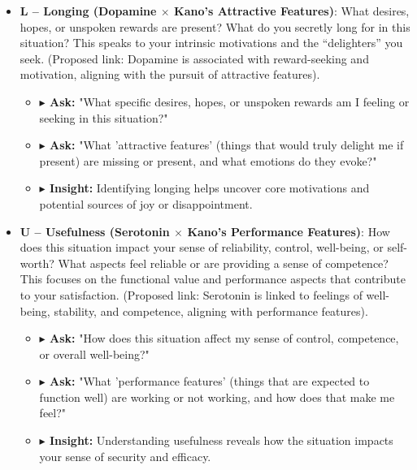 \documentclass{article}
\begin{document}
\begin{center}
\end{center}

\begin{itemize}[noitemsep,topsep=0pt]
    \item \textbf{L – Longing (Dopamine $\times$ Kano’s Attractive Features)}: What desires, hopes, or unspoken rewards are present? What do you secretly long for in this situation? This speaks to your intrinsic motivations and the ``delighters'' you seek. (Proposed link: Dopamine is associated with reward-seeking and motivation, aligning with the pursuit of attractive features).
    \begin{itemize}[noitemsep,topsep=0pt]
        \item \textbf{$\blacktriangleright$ Ask:} "What specific desires, hopes, or unspoken rewards am I feeling or seeking in this situation?"
        \item \textbf{$\blacktriangleright$ Ask:} "What 'attractive features' (things that would truly delight me if present) are missing or present, and what emotions do they evoke?"
        \item \textbf{$\blacktriangleright$ Insight:} Identifying longing helps uncover core motivations and potential sources of joy or disappointment.
    \end{itemize}
    \item \textbf{U – Usefulness (Serotonin $\times$ Kano’s Performance Features)}: How does this situation impact your sense of reliability, control, well-being, or self-worth? What aspects feel reliable or are providing a sense of competence? This focuses on the functional value and performance aspects that contribute to your satisfaction. (Proposed link: Serotonin is linked to feelings of well-being, stability, and competence, aligning with performance features).
    \begin{itemize}[noitemsep,topsep=0pt]
        \item \textbf{$\blacktriangleright$ Ask:} "How does this situation affect my sense of control, competence, or overall well-being?"
        \item \textbf{$\blacktriangleright$ Ask:} "What 'performance features' (things that are expected to function well) are working or not working, and how does that make me feel?"
        \item \textbf{$\blacktriangleright$ Insight:} Understanding usefulness reveals how the situation impacts your sense of security and efficacy.

\end{itemize}
\end{itemize}
\end{document}
